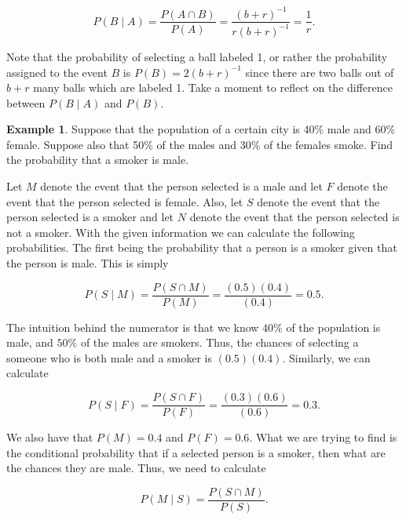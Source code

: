 \documentclass{article}
\theoremstyle{definition}
\theoremstyle{remark}
\theoremstyle{definition}
\newtheorem{example}{Example}[section]
\begin{document}
 \begin{equation*}
    P(B\mid A) =\frac{P(A\cap B)}{P(A)} 
    = \frac{(b+r)^{-1}}{r(b+r)^{-1}} 
    = \frac{1}{r}.
 \end{equation*}
 
 \noindent Note that the probability of selecting a ball labeled 1, or rather the probability assigned to the event $B$ is $P(B)=2(b+r)^{-1}$ since there are two balls out of $b+r$ many balls which are labeled 1. Take a moment to reflect on the difference between $P(B\mid A)$ and $P(B)$.

\begin{example}
    Suppose that the population of a certain city is 40$\%$ male and 60$\%$ female. Suppose also that 50$\%$ of the males and 30$\%$ of the females smoke. Find the probability that a smoker is male.\par Let $M$ denote the event that the person selected is a male and let $F$ denote the event that the person selected is female. Also, let $S$ denote the event that the person selected is a smoker and let $N$ denote the event that the person selected is not a smoker. With the given information we can calculate the following probabilities. The first being the probability that a person is a smoker given that the person is male. This is simply
    
    \begin{equation}
        P(S\mid M)=\frac{P(S\cap M)}{P(M)}=\frac{(0.5)(0.4)}{(0.4)}=0.5.
    \end{equation}
    
    The intuition behind the numerator is that we know $40\%$ of the population is male, and $50\%$ of the males are smokers. Thus, the chances of selecting a someone who is both male and a smoker is $(0.5)(0.4)$. Similarly, we can calculate 
    
    \begin{equation}
        P(S\mid F)=\frac{P(S\cap F)}{P(F)}=\frac{(0.3)(0.6)}{(0.6)}=0.3.
    \end{equation}
    
    \noindent We also have that $P(M)=0.4$ and $P(F)=0.6$. What we are trying to find is the conditional probability that if a selected person is a smoker, then what are the chances they are male. Thus, we need to calculate 
    
    \begin{equation*}
        P(M\mid S)=\frac{P(S\cap M)}{P(S)}.
    \end{equation*}
    

\end{example}
\end{document}
